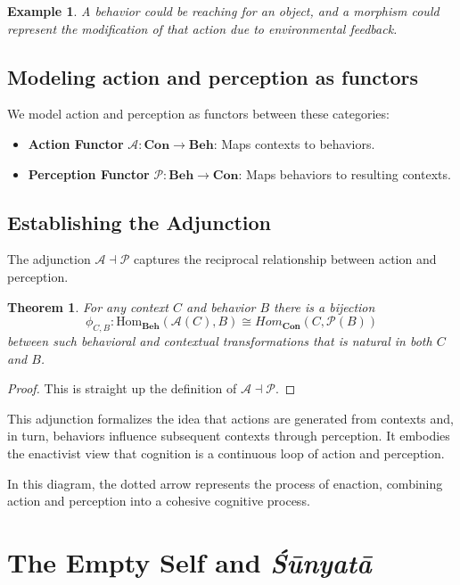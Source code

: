 \documentclass{article}
\newtheorem{theorem}{Theorem}[section]
\newtheorem{example}{Example}[section]
\begin{document}
\begin{example} A behavior could be reaching for an object, and a morphism could represent the modification of that action due to environmental feedback. \end{example}

\subsection{Modeling action and perception as functors}
We model action and perception as functors between these categories:

\begin{itemize} 
\item \textbf{Action Functor} $\mathcal{A} \colon \mathbf{Con} \to \mathbf{Beh}$: Maps contexts to behaviors. 
\item \textbf{Perception Functor} $\mathcal{P} \colon \mathbf{Beh} \to \mathbf{Con}$: Maps behaviors to resulting contexts. 
\end{itemize}

\subsection{Establishing the Adjunction}

The adjunction $\mathcal{A} \dashv \mathcal{P}$ captures the reciprocal relationship between action and perception.

\begin{theorem}
For any context $C$ and behavior $B$ there is a bijection
\[
\phi_{C, B} \colon \text{Hom}_{\textbf{Beh}} ( \mathcal{A} (C), B) \cong Hom_{\textbf{Con}} (C, \mathcal{P}(B))
\]
between such behavioral and contextual transformations that is natural in both $C$ and $B$.
\end{theorem}
\begin{proof}
This is straight up the definition of $\mathcal{A} \dashv \mathcal{P}$.
\end{proof}

This adjunction formalizes the idea that actions are generated from contexts and, in turn, behaviors influence subsequent contexts through perception. It embodies the enactivist view that cognition is a continuous loop of action and perception.

In this diagram, the dotted arrow represents the process of enaction, combining action and perception into a cohesive cognitive process.

\section{The Empty Self and \emph{Śūnyatā}}
\end{document}
